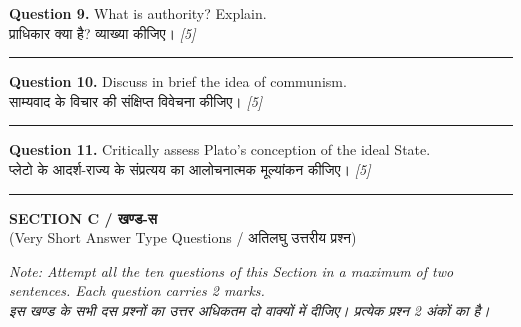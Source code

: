 \documentclass[11pt,a4paper]{article}
\newcommand{\pts}[1]{\hfill \textit{[#1]}}
\begin{document}
\noindent \textbf{Question 9.} What is authority? Explain.\\[1pt]
प्राधिकार क्या है? व्याख्या कीजिए। \pts{5}

\medskip\rule{\linewidth}{0.2pt}\medskip

\noindent \textbf{Question 10.} Discuss in brief the idea of communism.\\[1pt]
साम्यवाद के विचार की संक्षिप्त विवेचना कीजिए। \pts{5}

\medskip\rule{\linewidth}{0.2pt}\medskip

\noindent \textbf{Question 11.} Critically assess Plato's conception of the ideal State.\\[1pt]
प्लेटो के आदर्श-राज्य के संप्रत्यय का आलोचनात्मक मूल्यांकन कीजिए। \pts{5}

\bigskip
\rule{\linewidth}{0.2pt}
\bigskip

\begin{center}
  {\large\bfseries SECTION C / खण्ड-स}\\[2pt]
  {\normalsize (Very Short Answer Type Questions / अतिलघु उत्तरीय प्रश्न)}
\end{center}

\noindent \textit{Note: Attempt all the ten questions of this Section in a maximum of two sentences. Each question carries 2 marks.}\\[2pt]
\noindent \textit{इस खण्ड के सभी दस प्रश्नों का उत्तर अधिकतम दो वाक्यों में दीजिए। प्रत्येक प्रश्न 2 अंकों का है।}

\bigskip
\end{document}
